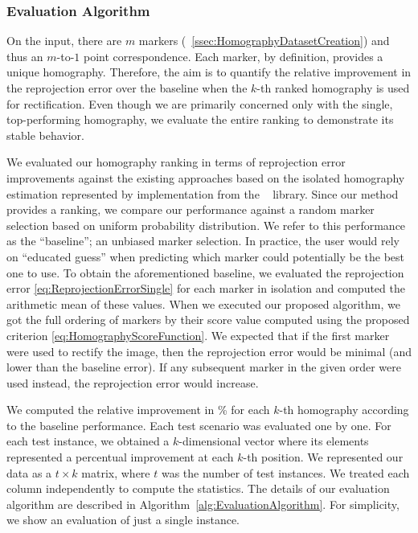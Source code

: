 \subsubsection{Evaluation Algorithm}
\label{sssec:EvaluationAlgorithm}

On the input, there are $m$ markers (\sectiontext{}~\ref{ssec:HomographyDatasetCreation}) and thus an $m$-to-$1$ point correspondence. Each marker, by definition, provides a unique homography. Therefore, the aim is to quantify the relative improvement in the reprojection error over the baseline when the $k$-th ranked homography is used for rectification. Even though we are primarily concerned only with the single, top-performing homography, we evaluate the entire ranking to demonstrate its stable behavior.

We evaluated our homography ranking in terms of reprojection error improvements against the existing approaches based on the isolated homography estimation represented by implementation from the \opencv{}~\cite{bradski2008learning} library. Since our method provides a ranking, we compare our performance against a random marker selection based on uniform probability distribution. We refer to this performance as the ``baseline''; an unbiased marker selection. In practice, the user would rely on ``educated guess'' when predicting which marker could potentially be the best one to use. To obtain the aforementioned baseline, we evaluated the reprojection error \ref{eq:ReprojectionErrorSingle} for each marker in isolation and computed the arithmetic mean of these values. When we executed our proposed algorithm, we got the full ordering of markers by their score value computed using the proposed criterion \ref{eq:HomographyScoreFunction}. We expected that if the first marker were used to rectify the image, then the reprojection error would be minimal (and lower than the baseline error). If any subsequent marker in the given order were used instead, the reprojection error would increase.

We computed the relative improvement in \% for each $k$-th homography according to the baseline performance. Each test scenario was evaluated one by one. For each test instance, we obtained a $k$-dimensional vector where its elements represented a percentual improvement at each $k$-th position. We represented our data as a $t \times k$ matrix, where $t$ was the number of test instances. We treated each column independently to compute the statistics. The details of our evaluation algorithm are described in Algorithm~\ref{alg:EvaluationAlgorithm}. For simplicity, we show an evaluation of just a single instance.

